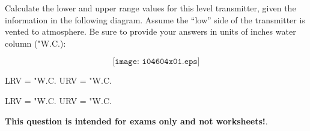 

Calculate the lower and upper range values for this level transmitter, given the information in the following diagram.  Assume the ``low'' side of the transmitter is vented to atmosphere.  Be sure to provide your answers in units of inches water column ("W.C.):

$$\texttt{[image: i04604x01.eps]}$$

LRV = \underbar{\hskip 50pt} "W.C. \hskip 100pt URV = \underbar{\hskip 50pt} "W.C.







LRV =  "W.C. \hskip 100pt URV =  "W.C.







{\bf This question is intended for exams only and not worksheets!}.



